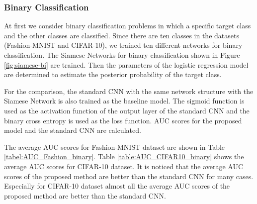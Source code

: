\documentclass[twocolumn,10pt]{article}
\begin{document}
\subsubsection{Binary Classification}
At first we consider binary classification problems in which a specific target class and the other classes are classified.
Since there are ten classes in the datasets (Fashion-MNIST and CIFAR-10), we trained ten different networks for binary classification.
The Siamese Networks for binary classification shown in Figure \ref{fig:siamese-bi} are trained.
Then the parameters of the logistic regression model are determined to estimate the posterior probability of the target class.

For the comparison, the standard CNN with the same network structure with the Siamese Network is also trained as the baseline model.
The sigmoid function is used as the activation function of the output layer of the standard CNN and the binary cross entropy is used as the loss function.
AUC scores for the proposed model and the standard CNN are calculated.

The average AUC scores for Fashion-MNIST dataset are shown in Table \ref{tabel:AUC_Fashion_binary}.
Table \ref{table:AUC_CIFAR10_binary} shows the average AUC scores for CIFAR-10 dataset.
It is noticed that the average AUC scores of the proposed method are better than the standard CNN for many cases.
Especially for CIFAR-10 dataset almost all the average AUC scores of the proposed method are better than the standard CNN. 




\end{document}
